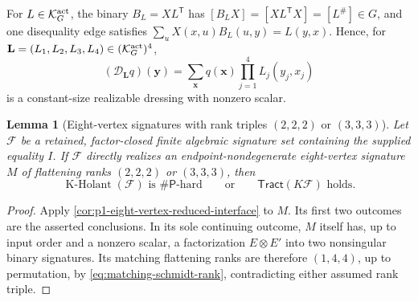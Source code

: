 \documentclass[11pt,letterpaper,onecolumn]{article}
\theoremstyle{plain}
\newtheorem{lemma}[lemma]{Lemma}
\theoremstyle{definition}
\theoremstyle{remark}
\newcommand{\cF}{\mathcal F}
\newcommand{\KHolant}{\operatorname{K\text{-}Holant}}
\newcommand{\Tract}{\mathsf{Tract}}
\newcommand{\SharpP}{\#\mathsf P}
\begin{document}
For \(L\in\mathcal K_G^{\rm act}\), the binary \(B_L=XL^{\mathsf T}\) has
\([B_LX]=[XL^{\mathsf T}X]=[L^\#]\in G\), and one disequality edge satisfies
\(\sum_uX(x,u)B_L(u,y)=L(y,x)\).  Hence, for
\(\mathbf L=(L_1,L_2,L_3,L_4)\in(\mathcal K_G^{\rm act})^4\),
\[
  (\mathscr D_{\mathbf L}q)({\mathbf{y}})
  =\sum_{\mathbf{x}}q({\mathbf{x}})\prod_{j=1}^4L_j(y_j,x_j)
\]
is a constant-size realizable dressing with nonzero scalar.

\begin{lemma}[Eight-vertex signatures with rank triples \((2,2,2)\) or \((3,3,3)\)]
\label{lem:p1-platonic-eight-vertex-rank-terminal}
Let \(\cF\) be a retained, factor-closed finite algebraic signature
set containing the supplied equality \(I\).  If \(\cF\) directly
realizes an endpoint-nondegenerate eight-vertex signature \(M\) of
flattening ranks \((2,2,2)\) or \((3,3,3)\), then
\[
  \KHolant(\cF)\text{ is }\SharpP\text{-hard}
  \qquad\text{or}\qquad
  \Tract(K\cF)\text{ holds}.
\]
\end{lemma}

\begin{proof}
Apply \cref{cor:p1-eight-vertex-reduced-interface} to \(M\).  Its first two
outcomes are the asserted conclusions.  In its sole continuing outcome,
\(M\) itself has, up to input order and a nonzero scalar, a factorization
\(E\otimes E'\) into two nonsingular binary signatures.  Its matching
flattening ranks are therefore \((1,4,4)\), up to permutation, by
\cref{eq:matching-schmidt-rank}, contradicting either assumed rank triple.
\end{proof}
\end{document}
